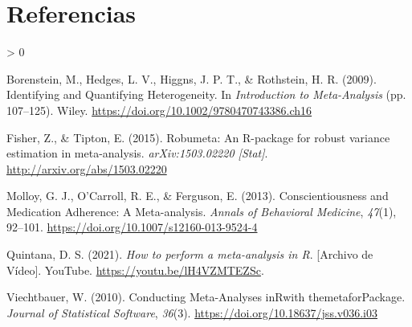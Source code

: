 \documentclass[
]{article}
\newlength{\cslhangindent}
\newenvironment{CSLReferences}[2] %
 {%
  \setlength{\parindent}{0pt}
  \ifodd #1 \everypar{\setlength{\hangindent}{\cslhangindent}}\ignorespaces\fi
  \ifnum #2 > 0
  \setlength{\parskip}{#2\baselineskip}
  \fi
 }%
 {}
\begin{document}
\hypertarget{referencias}{%
\section*{Referencias}\label{referencias}}

\hypertarget{refs}{}
\begin{CSLReferences}{1}{0}
\leavevmode\hypertarget{ref-borensteinIdentifyingQuantifyingHeterogeneity2009}{}%
Borenstein, M., Hedges, L. V., Higgns, J. P. T., \& Rothstein, H. R.
(2009). Identifying and {Quantifying Heterogeneity}. In
\emph{Introduction to {Meta}-{Analysis}} (pp. 107--125). Wiley.
\url{https://doi.org/10.1002/9780470743386.ch16}

\leavevmode\hypertarget{ref-fisherRobumetaRpackageRobust2015}{}%
Fisher, Z., \& Tipton, E. (2015). Robumeta: {An R}-package for robust
variance estimation in meta-analysis. \emph{arXiv:1503.02220
{[}Stat{]}}. \url{http://arxiv.org/abs/1503.02220}

\leavevmode\hypertarget{ref-molloy2013}{}%
Molloy, G. J., O'Carroll, R. E., \& Ferguson, E. (2013).
Conscientiousness and Medication Adherence: A Meta-analysis.
\emph{Annals of Behavioral Medicine}, \emph{47}(1), 92--101.
\url{https://doi.org/10.1007/s12160-013-9524-4}

\leavevmode\hypertarget{ref-quintanaHowPerformMetaanalysis2021}{}%
Quintana, D. S. (2021). \emph{How to perform a meta-analysis in {R}}.
{[}Archivo de {Vídeo}{]}. YouTube. \url{https://youtu.be/lH4VZMTEZSc}.

\leavevmode\hypertarget{ref-viechtbauer2010}{}%
Viechtbauer, W. (2010). Conducting Meta-Analyses inRwith
themetaforPackage. \emph{Journal of Statistical Software}, \emph{36}(3).
\url{https://doi.org/10.18637/jss.v036.i03}

\end{CSLReferences}
\end{document}
